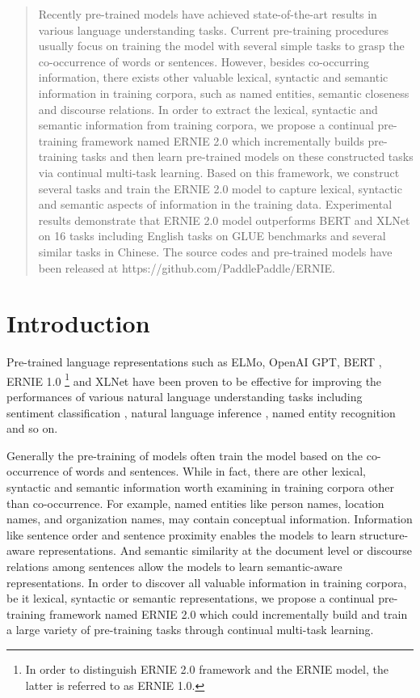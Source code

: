 \documentclass[letterpaper]{article} \usepackage{aaai20}  \usepackage{times}  \usepackage{helvet} \usepackage{courier}  \usepackage[hyphens]{url}  \usepackage{graphicx} \usepackage{makecell}
\author{Yu Sun, Shuohuan Wang, Yukun Li, Shikun Feng, Hao Tian, Hua Wu, Haifeng Wang \\
Baidu Inc., Beijing, China \\
\{sunyu02, wangshuohuan, tianhao, wu\_hua,wanghaifeng\}@baidu.com
}
\begin{document}
\maketitle
\begin{abstract}
Recently pre-trained models have achieved state-of-the-art results in various language understanding tasks.
Current pre-training procedures usually focus on training the model with several simple tasks to grasp the co-occurrence of words or sentences. 
However, besides co-occurring information, there exists other valuable lexical, syntactic and semantic information in training corpora, such as named entities, semantic closeness and discourse relations. 
In order to extract the lexical, syntactic and semantic information from training corpora, we propose a continual pre-training framework named ERNIE 2.0 which incrementally builds pre-training tasks and then learn pre-trained models on these constructed tasks via continual multi-task learning. 
Based on this framework, we construct several tasks and train the ERNIE 2.0 model to capture lexical, syntactic and semantic aspects of information in the training data.
Experimental results demonstrate that ERNIE 2.0 model outperforms BERT and XLNet on 16 tasks including English tasks on GLUE benchmarks and several similar tasks in Chinese.
The source codes and pre-trained models have been released at https://github.com/PaddlePaddle/ERNIE.
\end{abstract}

\section{Introduction}
Pre-trained language representations such as ELMo\cite{peters2018deep}, OpenAI GPT\cite{radford2018improving}, BERT \cite{devlin2018bert}, ERNIE 1.0 \cite{sun2019ernie}\footnote{In order to distinguish ERNIE 2.0 framework and the ERNIE model, the latter is referred to as ERNIE 1.0.\cite{sun2019ernie}} and XLNet\cite{yang2019xlnet} have been proven to be effective for improving the performances of various natural language understanding tasks including sentiment classification \cite{socher2013recursive}, natural language inference \cite{bowman2015large}, named entity recognition \cite{sang2003introduction} and so on.

Generally the pre-training of models often train the model based on the co-occurrence of words and sentences. While in fact, there are other lexical, syntactic and semantic information worth examining in training corpora other than co-occurrence. 
For example, named entities like person names, location names, and organization names, may contain conceptual information. Information like sentence order and sentence proximity enables the models to learn structure-aware representations. 
And semantic similarity at the document level or discourse relations among sentences allow the models to learn semantic-aware representations. 
In order to discover all valuable information in training corpora, be it lexical, syntactic or semantic representations, we propose a continual pre-training framework named ERNIE 2.0 which could incrementally build and train a large variety of pre-training tasks through continual multi-task learning.
\end{document}
